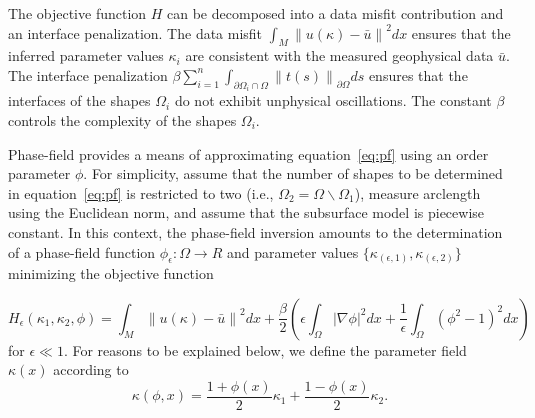 \documentclass[manuscript,revised]{geophysics}
\newcommand\norm[1]{\left\lVert#1\right\rVert}
\begin{document}
The objective function $H$ can be decomposed into a data misfit contribution and an interface penalization. The data misfit $\int_M \norm{u(\kappa)-\bar{u}}^2  dx$
ensures that the inferred parameter values $\kappa_i$ are consistent with the measured geophysical data $\bar{u}$. The interface penalization 
$\beta \sum_{i=1}^n \int_{\partial\Omega_i \cap \Omega} \norm{t(s)}_{\partial\Omega}  ds$
ensures that the interfaces of the shapes $\Omega_i$ do not exhibit unphysical oscillations. The constant $\beta$ controls the complexity of the shapes $\Omega_i$.

Phase-field provides a means of approximating equation~\ref{eq:pf} using an order parameter $\phi$.  For simplicity, assume that the number of shapes to be determined in equation~\ref{eq:pf} is restricted to two (i.e., $\Omega_2=\Omega\backslash\Omega_1$), measure arclength using the Euclidean norm, and assume that the subsurface model is piecewise constant.  In this context, the phase-field inversion amounts to the determination of a phase-field function $\phi_\epsilon:\Omega \rightarrow R$ and parameter values $\{ \kappa_{(\epsilon,1)}, \kappa_{(\epsilon,2)} \}$ minimizing the objective function 

\begin{equation} \label{eq:pf_epsilon}
H_\epsilon \left( \kappa_1,\kappa_2,\phi \right)=\int_M \norm{u(\kappa)-\bar{u}}^2  dx +\frac{\beta}{2} \left( \epsilon \int_\Omega \left\vert \nabla \phi \right\vert^2 dx+\frac{1}{\epsilon} \int_\Omega  \left( \phi^2-1 \right)^2 dx \right)
\end{equation}
for $\epsilon \ll 1$.  For reasons to be explained below, we define the parameter field $\kappa(x)$ according to
\begin{equation} \label{eq:pf_kappa}
\kappa(\phi,x) = \frac{1+\phi(x)}{2} \kappa_1 + \frac{1-\phi(x)}{2} \kappa_2.
\end{equation}
\end{document}
